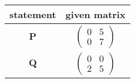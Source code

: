 \begin{tabular}[12pt]{ |c| c|}
    \hline
    \textbf{statement} & \textbf{given matrix}\\ 
    \hline
    $\mathbf{P}$ &  $\begin{pmatrix} 0 & 5 \\ 0 & 7 \end{pmatrix}$\\
    \hline
    $\mathbf{Q}$ &  $\begin{pmatrix} 0 & 0 \\ 2 & 5 \end{pmatrix}$\\
    \hline
    \end{tabular}